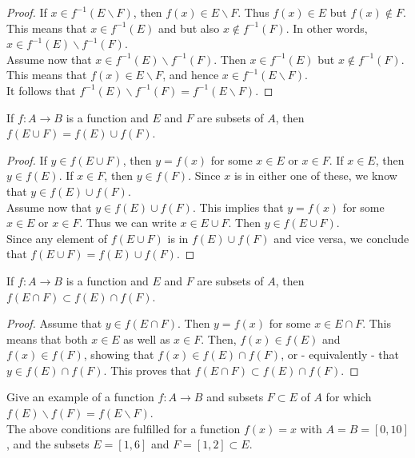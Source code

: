 \documentclass[12pt]{article}
\newenvironment{theorem}[2][Theorem]{\begin{trivlist}
\item[\hskip \labelsep {\bfseries #1}\hskip \labelsep {\bfseries #2.}]}{\end{trivlist}}
\newenvironment{question}[2][Question]{\begin{trivlist}
\item[\hskip \labelsep {\bfseries #1}\hskip \labelsep {\bfseries #2.}]}{\end{trivlist}}
\begin{document}
\begin{proof}
If $x \in f^{-1} (E \backslash F )$, then $f(x) \in E \backslash F$. Thus $f(x) \in E$ but $f(x) \notin F$. This means that $x \in f^{-1}(E)$ and but also $x \notin f^{-1}(F)$. In other words, $x \in f^{-1}(E) \backslash f^{-1} (F)$. \\
Assume now that $x \in f^{-1}(E) \backslash f^{-1} (F)$. Then $x \in f^{-1}(E)$ but $x \notin f^{-1}(F)$. This means that $f(x) \in E \backslash F$, and hence $x \in f^{-1} (E \backslash F)$. \\
It follows that  $f^{-1} (E) \backslash f^{-1} (F ) = f^{-1} (E \backslash F)$.
\end{proof}

\begin{theorem}{1.1.11}
If $f : A \to B$ is a function and $E$ and $F$ are subsets of $A$, then $f (E \cup F ) = f (E) \cup f (F )$.
\end{theorem}

\begin{proof}
If $y \in f(E \cup F)$, then $y = f(x)$ for some $x \in E$ or $x \in F$. If $x \in E$, then $y \in f(E)$. If $x \in F$, then $y \in f(F)$. Since $x$ is in either one of these, we know that $y \in f(E) \cup f(F)$. \\
Assume now that $y \in f(E) \cup f(F)$. This implies that $y=f(x)$ for some $x \in E$ or $x\in F$. Thus we can write $x \in E \cup F$. Then $y \in f(E \cup F)$. \\
Since any element of $f(E \cup F)$ is in $f(E) \cup f(F)$ and vice versa, we conclude that $f (E \cup F ) = f (E) \cup f (F )$.
\end{proof}


\begin{theorem}{1.1.12}
If $f : A \to B$ is a function and $E$ and $F$ are subsets of $A$, then $f (E \cap F ) \subset f (E) \cap f (F )$.
\end{theorem}

\begin{proof}
Assume that $y \in f(E \cap F)$. Then $y = f(x)$ for some $x \in E \cap F$. This means that both $x \in E$ as well as $x \in F$. Then, $f(x) \in f(E)$ and $f(x) \in f(F)$, showing that $f(x) \in f(E) \cap f(F)$, or - equivalently - that $y \in f(E) \cap f(F)$. This proves that $f (E \cap F ) \subset f (E) \cap f (F )$.
\end{proof}

\begin{question}{1.1.13}
Give an example of a function $f : A \to B$ and subsets $F\subset E$ of $A$ for
which $f (E) \backslash f (F ) = f (E \backslash F )$. \\

The above conditions are fulfilled for a function $f(x)=x$ with $A=B=[0,10]$, and the subsets $E=[1,6]$ and $F = [1,2] \subset E$.
\end{question}
\end{document}
